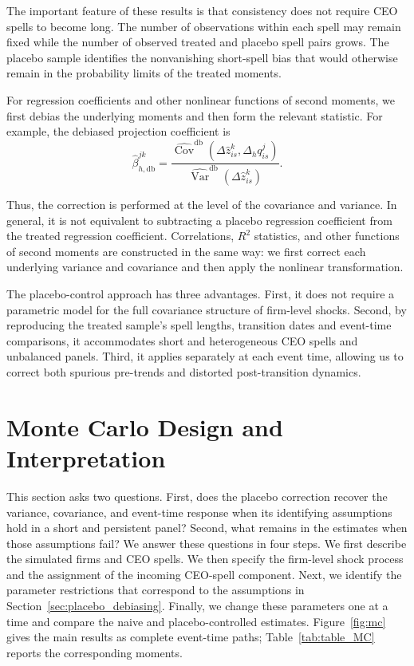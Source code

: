 \documentclass[sigconf,nonacm]{acmart}
\begin{document}
The important feature of these results is that consistency does not
require CEO spells to become long. The number of observations within
each spell may remain fixed while the number of observed treated and
placebo spell pairs grows. The placebo sample identifies the
nonvanishing short-spell bias that would otherwise remain in the
probability limits of the treated moments.

For regression coefficients and other nonlinear functions of second
moments, we first debias the underlying moments and then form the
relevant statistic. For example, the debiased projection coefficient is
\begin{equation}
\widehat\beta_{h,\mathrm{db}}^{jk}
=
\frac{
\widehat{\operatorname{Cov}}^{\mathrm{db}}\!\left(
\Delta\widehat z_{is}^{k},
\Delta_h q_{is}^{j}
\right)
}{
\widehat{\operatorname{Var}}^{\mathrm{db}}\!\left(
\Delta\widehat z_{is}^{k}
\right)
}.
\label{eq:debiased_beta}
\end{equation}

Thus, the correction is performed at the level of the covariance and
variance. In general, it is not equivalent to subtracting a placebo
regression coefficient from the treated regression coefficient.
Correlations, $R^2$ statistics, and other functions of second moments
are constructed in the same way: we first correct each underlying
variance and covariance and then apply the nonlinear transformation.

The placebo-control approach has three advantages. First, it does not
require a parametric model for the full covariance structure of
firm-level shocks. Second, by reproducing the treated sample's spell
lengths, transition dates and event-time comparisons, it accommodates short and heterogeneous CEO spells and
unbalanced panels. Third, it applies separately at each event time,
allowing us to correct both spurious pre-trends and distorted
post-transition dynamics.


\section{Monte Carlo Design and Interpretation}\label{sec:MC}

This section asks two questions. First, does the placebo correction recover the variance, covariance, and event-time response when its identifying assumptions hold in a short and persistent panel? Second, what remains in the estimates when those assumptions fail? We answer these questions in four steps. We first describe the simulated firms and CEO spells. We then specify the firm-level shock process and the assignment of the incoming CEO-spell component. Next, we identify the parameter restrictions that correspond to the assumptions in Section~\ref{sec:placebo_debiasing}. Finally, we change these parameters one at a time and compare the naive and placebo-controlled estimates. Figure~\ref{fig:mc} gives the main results as complete event-time paths; Table~\ref{tab:table_MC} reports the corresponding moments.
\end{document}

